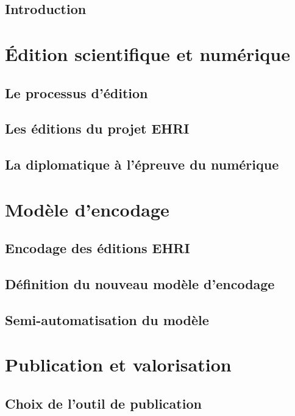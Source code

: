 \documentclass[a4paper, 12pt, twoside]{book}
\begin{document}
    \chapter{Introduction}
    

    \thispagestyle{empty}
    \cleardoublepage

    \mainmatter
    \part{Édition scientifique et numérique}
    \chapter{Le processus d'édition}
    
    \chapter{Les éditions du projet EHRI}
    
    \chapter{La diplomatique à l'épreuve du numérique}
    

    \part{Modèle d'encodage}
    \chapter{Encodage des éditions EHRI}
    
    \chapter{Définition du nouveau modèle d’encodage}
    
    \chapter{Semi-automatisation du modèle}
    

    \part{Publication et valorisation}
    \chapter{Choix de l'outil de publication}
    
\end{document}
